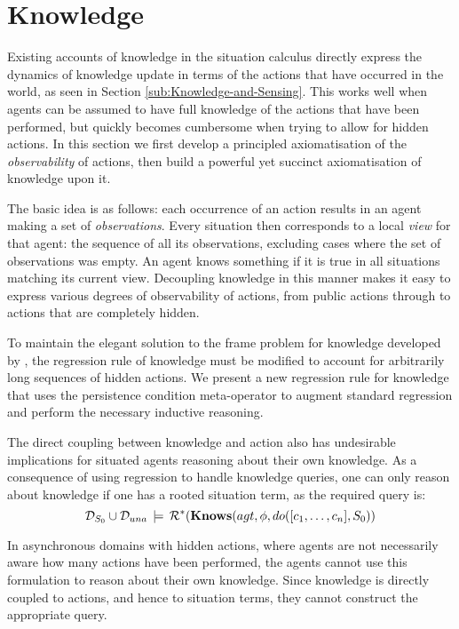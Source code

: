 


\chapter{Knowledge}

\label{ch:knowledge} 

Existing accounts of knowledge in the situation calculus directly
express the dynamics of knowledge update in terms of the actions that
have occurred in the world, as seen in Section \ref{sub:Knowledge-and-Sensing}.
This works well when agents can be assumed to have full knowledge
of the actions that have been performed, but quickly becomes cumbersome
when trying to allow for hidden actions. In this section we first
develop a principled axiomatisation of the \emph{observability} of
actions, then build a powerful yet succinct axiomatisation of knowledge
upon it.

The basic idea is as follows: each occurrence of an action results
in an agent making a set of \emph{observations}. Every situation then
corresponds to a local \emph{view} for that agent: the sequence of
all its observations, excluding cases where the set of observations
was empty. An agent knows something if it is true in all situations
matching its current view. Decoupling knowledge in this manner makes
it easy to express various degrees of observability of actions, from
public actions through to actions that are completely hidden. 

To maintain the elegant solution to the frame problem for knowledge
developed by \citet{scherl03sc_knowledge}, the regression rule of
knowledge must be modified to account for arbitrarily long sequences
of hidden actions. We present a new regression rule for knowledge
that uses the persistence condition meta-operator to augment standard
regression and perform the necessary inductive reasoning.

The direct coupling between knowledge and action also has undesirable
implications for situated agents reasoning about their own knowledge.
As a consequence of using regression to handle knowledge queries,
one can only reason about knowledge if one has a rooted situation
term, as the required query is:\[
\mathcal{D}_{S_{0}}\cup\mathcal{D}_{una}\,\models\,\mathcal{R}^{*}(\mathbf{Knows}(agt,\phi,do([c_{1},\dots,c_{n}],S_{0}))\]


In asynchronous domains with hidden actions, where agents are not
necessarily aware how many actions have been performed, the agents
cannot use this formulation to reason about their own knowledge. Since
knowledge is directly coupled to actions, and hence to situation terms,
they cannot construct the appropriate query.

